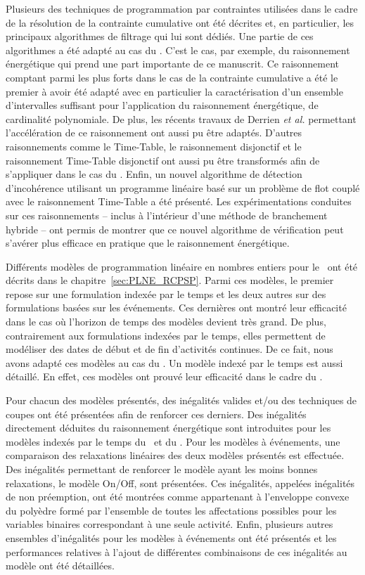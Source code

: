 Plusieurs des techniques de programmation par contraintes utilisées dans le
cadre de la résolution de la contrainte cumulative ont été décrites et, en
particulier, les principaux algorithmes de filtrage qui lui sont
dédiés. Une partie de ces algorithmes a été adapté au cas du
\CECSP. C'est le cas, par exemple, du raisonnement énergétique qui
prend une part importante de ce manuscrit. Ce raisonnement comptant
parmi les plus forts dans le cas de la contrainte cumulative a été le
premier à avoir été adapté  avec en particulier la caractérisation
d'un ensemble d'intervalles suffisant pour l'application du
raisonnement énergétique, de
cardinalité polynomiale. De plus, les récents travaux de Derrien
{\it et al.} permettant l'accélération de ce raisonnement ont aussi pu
être adaptés. D'autres raisonnements comme le Time-Table, le
raisonnement disjonctif et le raisonnement Time-Table disjonctif ont
aussi pu être transformés afin de s'appliquer dans le cas du
\CECSP. Enfin, un nouvel algorithme de détection d'incohérence
utilisant un programme linéaire basé sur un problème de flot couplé
avec le raisonnement Time-Table a été présenté. Les expérimentations
conduites sur ces raisonnements -- inclus à l'intérieur d'une méthode
de branchement hybride -- ont permis de montrer que ce nouvel
algorithme de vérification peut s'avérer plus efficace en pratique que
le raisonnement énergétique.

Différents modèles de programmation linéaire en nombres entiers pour le
\RCPSP~ont été décrits dans le chapitre~\ref{sec:PLNE_RCPSP}. Parmi
ces modèles, le premier repose sur une formulation indexée par le temps
et les deux autres sur des formulations basées sur les événements. Ces
dernières ont montré leur efficacité dans le cas où l'horizon de temps
des modèles devient très grand. De plus, contrairement aux
formulations 
indexées par le temps, elles permettent de modéliser des dates de début
et de fin d'activités continues. De ce fait, nous avons adapté ces
modèles au cas du \CECSP. Un modèle indexé par le temps est aussi
détaillé. En effet, ces modèles ont prouvé leur efficacité dans le
cadre du \RCPSP.

Pour chacun des modèles présentés, des inégalités valides et/ou des
techniques de coupes ont été présentées afin de renforcer ces
derniers. Des inégalités directement déduites du raisonnement
énergétique sont introduites pour les modèles indexés par le temps du
\CECSP~et du \RCPSP. Pour les modèles à événements, une comparaison
des relaxations linéaires des deux modèles présentés est
effectuée. Des inégalités permettant de renforcer le modèle ayant les
moins bonnes relaxations, le modèle On/Off, sont présentées. Ces
inégalités, appelées inégalités de non préemption, ont été montrées 
comme appartenant à l'enveloppe convexe du polyèdre formé par
l’ensemble de toutes les affectations possibles pour les variables
binaires correspondant à une seule activité. Enfin, plusieurs autres
ensembles d'inégalités pour les modèles à événements ont été présentés
et les performances relatives à l'ajout de différentes combinaisons de
ces inégalités au modèle ont été détaillées. 

